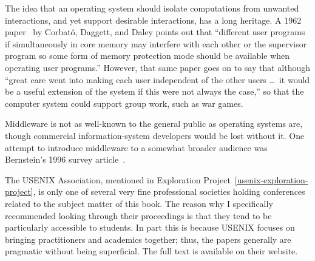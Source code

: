The idea that an operating system should isolate computations from
unwanted interactions, and yet support desirable interactions, has a
long heritage.  A 1962 paper~\cite{max1169} by Corbat{\'o}, Daggett,
and Daley points out that ``different user programs if simultaneously
in core memory may interfere with each other or the supervisor program
so some form of memory protection mode should be available when
operating user programs.'' However, that same paper goes on to say
that although ``great care went into making each user independent of
the other users \ldots\ it would be a useful extension of the system if
this were not always the case,'' so that the computer system could
support group work, such as war games.

Middleware is not as well-known to the general public as operating
systems are, though commercial information-system developers would be
lost without it.  One attempt to introduce middleware to a somewhat
broader audience was Bernstein's 1996 survey article~\cite{max1016}.

The USENIX Association, mentioned in Exploration
Project~\ref{usenix-exploration-project}, is only one of several very
fine professional societies holding conferences related to the subject
matter of this book.  The reason why I specifically recommended looking through
their proceedings is that they tend to be particularly
accessible to students.  In part this is because USENIX focuses on
bringing practitioners and academics together; thus, the papers
generally are pragmatic without being superficial.
The full text is available on their website.
